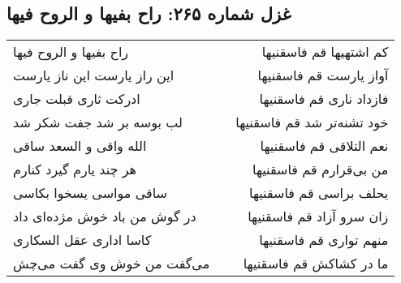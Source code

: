 \begin{center}
\section*{غزل شماره ۲۶۵: راح بفیها و الروح فیها}
\label{sec:0265}
\begin{longtable}{l p{0.5cm} r}
راح بفیها و الروح فیها
&&
کم اشتهیها قم فاسقنیها
\\
این راز یارست این ناز یارست
&&
آواز یارست قم فاسقنیها
\\
ادرکت ثاری قبلت جاری
&&
فازداد ناری قم فاسقنیها
\\
لب بوسه بر شد جفت شکر شد
&&
خود تشنه‌تر شد قم فاسقنیها
\\
الله واقی و السعد ساقی
&&
نعم التلاقی قم فاسقنیها
\\
هر چند یارم گیرد کنارم
&&
من بی‌قرارم قم فاسقنیها
\\
ساقی مواسی یسخوا بکاسی
&&
یحلف براسی قم فاسقنیها
\\
در گوش من باد خوش مژده‌ای داد
&&
زان سرو آزاد قم فاسقنیها
\\
کاسا اداری عقل السکاری
&&
منهم تواری قم فاسقنیها
\\
می‌گفت من خوش وی گفت می‌چش
&&
ما در کشاکش قم فاسقنیها
\\
\end{longtable}
\end{center}
